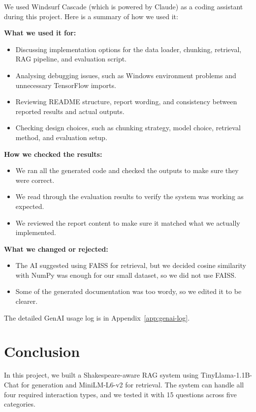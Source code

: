\documentclass[10pt,conference]{IEEEtran}
\begin{document}
We used Windsurf Cascade (which is powered by Claude) as a coding assistant during this project. Here is a summary of how we used it:

\textbf{What we used it for:}
\begin{itemize}
    \item Discussing implementation options for the data loader, chunking, retrieval, RAG pipeline, and evaluation script.
    \item Analysing debugging issues, such as Windows environment problems and unnecessary TensorFlow imports.
    \item Reviewing README structure, report wording, and consistency between reported results and actual outputs.
    \item Checking design choices, such as chunking strategy, model choice, retrieval method, and evaluation setup.
\end{itemize}

\textbf{How we checked the results:}
\begin{itemize}
    \item We ran all the generated code and checked the outputs to make sure they were correct.
    \item We read through the evaluation results to verify the system was working as expected.
    \item We reviewed the report content to make sure it matched what we actually implemented.
\end{itemize}

\textbf{What we changed or rejected:}
\begin{itemize}
    \item The AI suggested using FAISS for retrieval, but we decided cosine similarity with NumPy was enough for our small dataset, so we did not use FAISS.
    \item Some of the generated documentation was too wordy, so we edited it to be clearer.
\end{itemize}


The detailed GenAI usage log is in Appendix~\ref{app:genai-log}.

\section{Conclusion}
\label{sec:conclusion}

In this project, we built a Shakespeare-aware RAG system using TinyLlama-1.1B-Chat for generation and MiniLM-L6-v2 for retrieval. The system can handle all four required interaction types, and we tested it with 15 questions across five categories.
\end{document}
